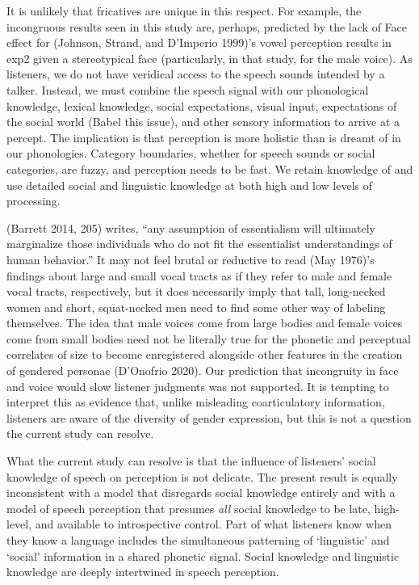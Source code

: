 \documentclass[
  letterpaper,
  DIV=11,
  numbers=noendperiod]{scrartcl}
\begin{document}
It is unlikely that fricatives are unique in this respect. For example,
the incongruous results seen in this study are, perhaps, predicted by
the lack of Face effect for (Johnson, Strand, and D'Imperio 1999)'s
vowel perception results in exp2 given a stereotypical face
(particularly, in that study, for the male voice). As listeners, we do
not have veridical access to the speech sounds intended by a talker.
Instead, we must combine the speech signal with our phonological
knowledge, lexical knowledge, social expectations, visual input,
expectations of the social world (Babel this issue), and other sensory
information to arrive at a percept. The implication is that perception
is more holistic than is dreamt of in our phonologies. Category
boundaries, whether for speech sounds or social categories, are fuzzy,
and perception needs to be fast. We retain knowledge of and use detailed
social and linguistic knowledge at both high and low levels of
processing.

(Barrett 2014, 205) writes, ``any assumption of essentialism will
ultimately marginalize those individuals who do not fit the essentialist
understandings of human behavior.'' It may not feel brutal or reductive
to read (May 1976)'s findings about large and small vocal tracts as if
they refer to male and female vocal tracts, respectively, but it does
necessarily imply that tall, long-necked women and short, squat-necked
men need to find some other way of labeling themselves. The idea that
male voices come from large bodies and female voices come from small
bodies need not be literally true for the phonetic and perceptual
correlates of size to become enregistered alongside other features in
the creation of gendered personae (D'Onofrio 2020). Our prediction that
incongruity in face and voice would slow listener judgments was not
supported. It is tempting to interpret this as evidence that, unlike
misleading coarticulatory information, listeners are aware of the
diversity of gender expression, but this is not a question the current
study can resolve.

What the current study can resolve is that the influence of listeners'
social knowledge of speech on perception is not delicate. The present
result is equally inconsistent with a model that disregards social
knowledge entirely and with a model of speech perception that presumes
\emph{all} social knowledge to be late, high-level, and available to
introspective control. Part of what listeners know when they know a
language includes the simultaneous patterning of `linguistic' and
`social' information in a shared phonetic signal. Social knowledge and
linguistic knowledge are deeply intertwined in speech perception.
\end{document}
